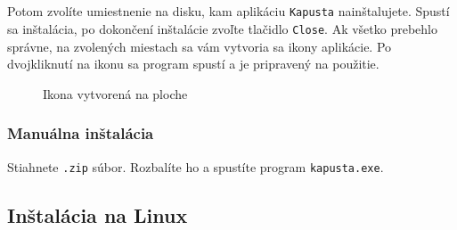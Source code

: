 \documentclass[a4paper, 11pt]{article}
\begin{document}
            \\
            \\
            Potom zvolíte umiestnenie na disku, kam aplikáciu \verb|Kapusta| nainštalujete. Spustí sa inštalácia, po dokončení inštalácie zvoľte tlačidlo \verb|Close|. Ak všetko prebehlo správne, na zvolených miestach sa vám vytvoria sa ikony aplikácie. Po dvojkliknutí na ikonu sa program spustí a je pripravený na použitie.
            \begin{figure}[h]
                    \centering
                        \caption{Ikona vytvorená na ploche}
                \end{figure}
            \subsubsection{Manuálna inštalácia}
            Stiahnete \verb|.zip| súbor. Rozbalíte ho a spustíte program \verb|kapusta.exe|.
            \newpage
        \subsection{Inštalácia na Linux}
\end{document}
